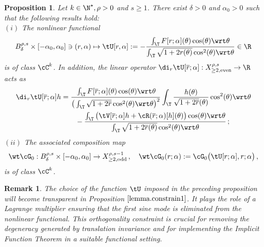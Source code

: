 \documentclass[a4paper,reqno,10pt]{article}
\newtheorem{pro}{Proposition}[section]
\newtheorem{rem}{Remark}[section]
\begin{document}
\begin{pro}\label{lemma.constrain}
	Let $k\in\N^\star, \rho>0$ and $s\geq 1$. There exist $\delta>0$ and  $\alpha_{0}>0$ such that the following results  hold:
	\\[1mm]
	\noindent ${(i)}$
	The nonlinear functional
	\begin{equation}\label{fixed.constrain}
		B_\delta^{\rho,s} \times [-\alpha_{0},\alpha_{0}] \ni (r,\alpha) \mapsto \tU[r,\alpha] := - \frac{\int_{\T}F[r;\alpha](\theta)\cos(\theta) \wrt \theta}{\int_{\T}\sqrt{1+2 r(\theta)}\cos^2(\theta) \wrt\theta}\in \R
	\end{equation}
	is of class  {$\cC^k$.} In addition, the linear operator $\di_{r} \tU[\overline r;\alpha]: X_{\geq 2,\rm even}^{\rho,s} \to \R$  acts as
	\begin{align*}
		\di_{r} \tU[\overline r;\alpha] h &=  \frac{ \, \int_{\T}F[\overline r;\alpha](\theta) \cos(\theta) \wrt \theta  }{\big( \int_{\T} \sqrt{1+2\overline r} \cos^2(\theta)\wrt \theta \big)^2}\int_{\T} \frac{h(\theta)}{\sqrt{1+2\overline r}(\theta) }\cos^2(\theta)\wrt \theta \\&\qquad- \frac{\int_{\T}\big( \tV[\overline r;\alpha]h + \cR(\overline r;\alpha)[h](\theta) \big) \cos(\theta) \wrt \theta}{\int_{\T}\sqrt{1+2 \overline{r}(\theta)}\cos^2(\theta) \wrt\theta} \,;
	\end{align*}
	\noindent $(ii)$
 The associated composition map
	\begin{equation}\label{G0.reduced.def}
		\wt\cG_{0}: B_\delta^{\rho,s} \times [-\alpha_{0},\alpha_{0}] \to X_{\geq 2,\rm odd}^{\rho,s-1} \,, \quad \wt\cG_{0}(r;\alpha) := \cG_{0}\big( \tU[r;\alpha], r;\alpha \big)\,,
	\end{equation}
	is  of class $\cC^k$.
	
\end{pro}
\begin{rem}
The choice of the function $\tU$ imposed in the preceding proposition will become transparent in Proposition $\ref{lemma.constrain1}$. It plays the role of a Lagrange multiplier ensuring that the first sine mode is eliminated from the nonlinear functional. This orthogonality constraint is crucial for removing the degeneracy generated by translation invariance and for implementing the Implicit Function Theorem in a suitable functional setting.
\end{rem}
\end{document}
